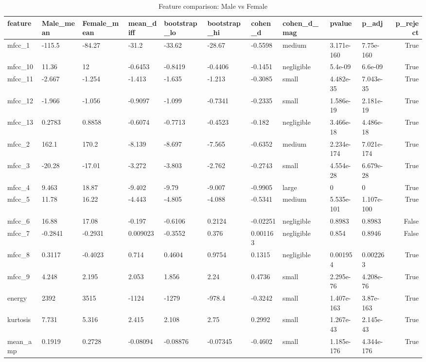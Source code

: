 \begin{table}
\caption{Feature comparison: Male vs Female}
\label{tab:male_female}
\begin{tabular}{llllllllllr}
\toprule
feature & Male_mean & Female_mean & mean_diff & bootstrap_lo & bootstrap_hi & cohen_d & cohen_d_mag & pvalue & p_adj & p_reject \\
\midrule
mfcc_1 & -115.5 & -84.27 & -31.2 & -33.62 & -28.67 & -0.5598 & medium & 3.171e-160 & 7.75e-160 & True \\
mfcc_10 & 11.36 & 12 & -0.6453 & -0.8419 & -0.4406 & -0.1451 & negligible & 5.4e-09 & 6.6e-09 & True \\
mfcc_11 & -2.667 & -1.254 & -1.413 & -1.635 & -1.213 & -0.3085 & small & 4.482e-35 & 7.043e-35 & True \\
mfcc_12 & -1.966 & -1.056 & -0.9097 & -1.099 & -0.7341 & -0.2335 & small & 1.586e-19 & 2.181e-19 & True \\
mfcc_13 & 0.2783 & 0.8858 & -0.6074 & -0.7713 & -0.4523 & -0.182 & negligible & 3.466e-18 & 4.486e-18 & True \\
mfcc_2 & 162.1 & 170.2 & -8.139 & -8.697 & -7.565 & -0.6352 & medium & 2.234e-174 & 7.021e-174 & True \\
mfcc_3 & -20.28 & -17.01 & -3.272 & -3.803 & -2.762 & -0.2743 & small & 4.554e-28 & 6.679e-28 & True \\
mfcc_4 & 9.463 & 18.87 & -9.402 & -9.79 & -9.007 & -0.9905 & large & 0 & 0 & True \\
mfcc_5 & 11.78 & 16.22 & -4.443 & -4.805 & -4.088 & -0.5341 & medium & 5.535e-101 & 1.107e-100 & True \\
mfcc_6 & 16.88 & 17.08 & -0.197 & -0.6106 & 0.2124 & -0.02251 & negligible & 0.8983 & 0.8983 & False \\
mfcc_7 & -0.2841 & -0.2931 & 0.009023 & -0.3552 & 0.376 & 0.001163 & negligible & 0.854 & 0.8946 & False \\
mfcc_8 & 0.3117 & -0.4023 & 0.714 & 0.4604 & 0.9754 & 0.1315 & negligible & 0.001954 & 0.002263 & True \\
mfcc_9 & 4.248 & 2.195 & 2.053 & 1.856 & 2.24 & 0.4736 & small & 2.295e-76 & 4.208e-76 & True \\
energy & 2392 & 3515 & -1124 & -1279 & -978.4 & -0.3242 & small & 1.407e-163 & 3.87e-163 & True \\
kurtosis & 7.731 & 5.316 & 2.415 & 2.108 & 2.75 & 0.2992 & small & 1.267e-43 & 2.145e-43 & True \\
mean_amp & 0.1919 & 0.2728 & -0.08094 & -0.08876 & -0.07345 & -0.4602 & small & 1.185e-176 & 4.344e-176 & True \\

\end{tabular}
\end{table}
